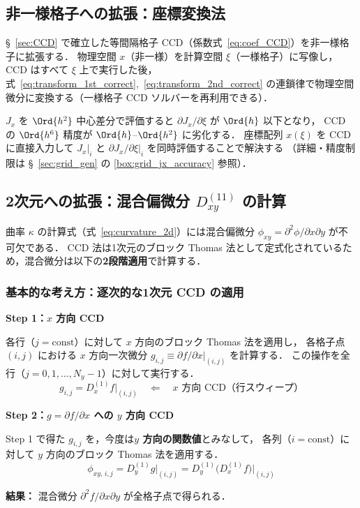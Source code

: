 %
%
\subsection{非一様格子への拡張：座標変換法}
\label{sec:ccd_metric}

§~\ref{sec:CCD} で確立した等間隔格子 CCD（係数式~\eqref{eq:coef_CCD}）を非一様格子に拡張する．
物理空間 $x$（非一様）を計算空間 $\xi$（一様格子）に写像し，
CCD はすべて $\xi$ 上で実行した後，式~\eqref{eq:transform_1st_correct},~\eqref{eq:transform_2nd_correct} の連鎖律で物理空間微分に変換する（一様格子 CCD ソルバーを再利用できる）．

\begin{tcolorbox}[warnbox, title={$\partial J_x/\partial\xi$ の精度：全体精度への影響}]
$J_x$ を $\Ord{h^2}$ 中心差分で評価すると $\partial J_x/\partial\xi$ が $\Ord{h}$ 以下となり，
CCD の $\Ord{h^6}$ 精度が $\Ord{h}$–$\Ord{h^2}$ に劣化する．
座標配列 $x(\xi)$ を CCD に直接入力して $J_x|_i$ と $\partial J_x/\partial\xi|_i$ を同時評価することで解決する
（詳細・精度制限は §~\ref{sec:grid_gen} の \ref{box:grid_jx_accuracy} 参照）．
\end{tcolorbox}

\subsection{2次元への拡張：混合偏微分 \texorpdfstring{$D_{xy}^{(11)}$}{Dxy\^{}(11)} の計算}
\label{sec:ccd_mixed}

曲率 $\kappa$ の計算式（式~\eqref{eq:curvature_2d}）には混合偏微分 $\phi_{xy} = \partial^2\phi/\partial x\partial y$ が不可欠である．
CCD 法は1次元のブロック Thomas 法として定式化されているため，混合微分は以下の\textbf{2段階適用}で計算する．

\subsubsection{基本的な考え方：逐次的な1次元 CCD の適用}

\begin{tcolorbox}[resultbox, title={混合微分 $\partial^2 f/\partial x\partial y$ の計算}]
\textbf{Step 1：$x$ 方向 CCD}

各行（$j = \text{const}$）に対して $x$ 方向のブロック Thomas 法を適用し，
各格子点 $(i,j)$ における $x$ 方向一次微分 $g_{i,j} \equiv \partial f/\partial x \big|_{(i,j)}$ を計算する．
この操作を全行（$j = 0, 1, \ldots, N_y-1$）に対して実行する．
\[
  g_{i,j} = D_x^{(1)} f \big|_{(i,j)} \quad \Leftarrow \quad x \text{ 方向 CCD（行スウィープ）}
\]

\textbf{Step 2：$g = \partial f/\partial x$ への $y$ 方向 CCD}

Step 1 で得た $g_{i,j}$ を，今度は\textbf{$y$ 方向の関数値}とみなして，
各列（$i = \text{const}$）に対して $y$ 方向のブロック Thomas 法を適用する．
\[
  \phi_{xy,\,i,j} = D_y^{(1)} g \big|_{(i,j)} = D_y^{(1)}\bigl(D_x^{(1)} f\bigr)\big|_{(i,j)}
\]

\textbf{結果：} 混合微分 $\partial^2 f/\partial x \partial y$ が全格子点で得られる．
\end{tcolorbox}

